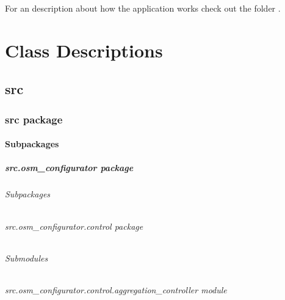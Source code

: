 \documentclass[letterpaper,10pt,english]{sphinxmanual}
\begin{document}
\sphinxAtStartPar
For an description about how the application works check out the folder
.


\chapter{Class Descriptions}
\label{\detokenize{index:class-descriptions}}
\sphinxstepscope


\section{src}
\label{\detokenize{apidoc/modules:src}}\label{\detokenize{apidoc/modules::doc}}
\sphinxstepscope


\subsection{src package}
\label{\detokenize{apidoc/src:src-package}}\label{\detokenize{apidoc/src::doc}}

\subsubsection{Subpackages}
\label{\detokenize{apidoc/src:subpackages}}
\sphinxstepscope


\paragraph{src.osm\_configurator package}
\label{\detokenize{apidoc/src.osm_configurator:src-osm-configurator-package}}\label{\detokenize{apidoc/src.osm_configurator::doc}}

\subparagraph{Subpackages}
\label{\detokenize{apidoc/src.osm_configurator:subpackages}}
\sphinxstepscope


\subparagraph{src.osm\_configurator.control package}
\label{\detokenize{apidoc/src.osm_configurator.control:src-osm-configurator-control-package}}\label{\detokenize{apidoc/src.osm_configurator.control::doc}}

\subparagraph{Submodules}
\label{\detokenize{apidoc/src.osm_configurator.control:submodules}}

\subparagraph{src.osm\_configurator.control.aggregation\_controller module}
\label{\detokenize{apidoc/src.osm_configurator.control:module-src.osm_configurator.control.aggregation_controller}}\label{\detokenize{apidoc/src.osm_configurator.control:src-osm-configurator-control-aggregation-controller-module}}
\end{document}
